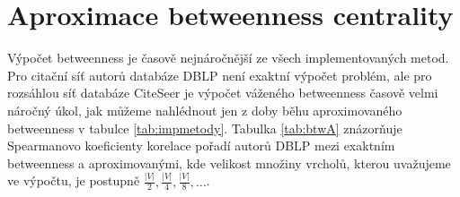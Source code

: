 \documentclass{bakalarka}
\begin{document}
\begin{table}[!ht]
\centering
{}
\caption{Součty pořadí oceněných autorů pro CiteSeer}
\label{tab:oceneni2}
\end{table}


\section{Aproximace betweenness centrality}
Výpočet betweenness je časově nejnáročnější ze všech implementovaných metod.
Pro citační síť autorů databáze DBLP není exaktní výpočet problém, ale pro
rozsáhlou síť databáze CiteSeer je výpočet váženého betweenness časově velmi
náročný úkol, jak můžeme nahlédnout jen z doby běhu aproximovaného betweenness
v tabulce \ref{tab:impmetody}.  Tabulka \ref{tab:btwA} znázorňuje Spearmanovo
koeficienty korelace pořadí autorů DBLP mezi exaktním betweenness a
aproximovanými, kde velikost množiny vrcholů, kterou uvažujeme ve výpočtu, je
postupně $\frac{|V|}{2}, \frac{|V|}{4}, \frac{|V|}{8}, \ldots$.


\begin{table}[!ht]
\begin{center}
\end{center}
\caption{Tabulka Spearmano koeficientů korelace mezi exaktním a aproximovaným betweenness}
\label{tab:btwA}
\end{table}
\end{document}
